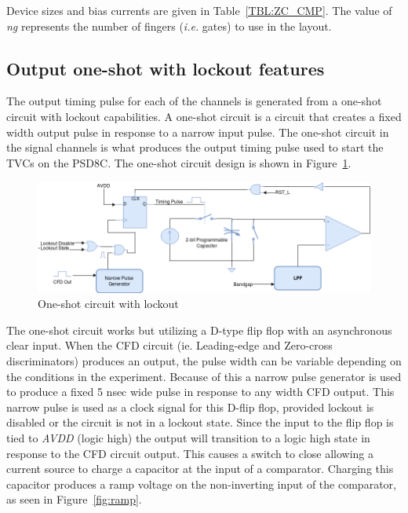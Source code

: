 \documentclass[12pt,oneside,final]{siuethesis}
\theoremstyle{definition}
\begin{document}
Device sizes and bias currents are given in Table~\ref{TBL:ZC_CMP}. The value of \emph{ng} represents the number of fingers (\emph{i.e.} gates) to use in the layout.\\ 
\subsection{Output one-shot with lockout features}
\par The output timing pulse for each of the channels is generated from a one-shot circuit with lockout capabilities. A one-shot circuit is a circuit that creates a fixed width output pulse in response to a narrow input pulse. The one-shot circuit in the signal channels is what produces the output timing pulse used to start the TVCs on the PSD8C. The one-shot circuit design is shown in Figure~\ref{fig:oneshot-circuit}.

\begin{figure}[htbp!]
\centering
\includegraphics[scale=.50,keepaspectratio=true]{./ch3_figures/oneshot_circuit.png} 
\caption{One-shot circuit with lockout}
\label{fig:oneshot-circuit}
\end{figure}

\par The one-shot circuit works but utilizing a D-type flip flop with an asynchronous clear input. When the CFD circuit (ie. Leading-edge and Zero-cross discriminators) produces an output, the pulse width can be variable depending on the conditions in the experiment. Because of this a narrow pulse generator is used to produce a fixed 5 nsec wide pulse in response to any width CFD output. This narrow pulse is used as a clock signal for this D-flip flop, provided lockout is disabled or the circuit is not in a lockout state. Since the input to the flip flop is tied to \emph{AVDD} (logic high) the output will transition to a logic high state in response to the CFD circuit output. This causes a switch to close allowing a current source to charge a capacitor at the input of a comparator. Charging this capacitor produces a ramp voltage on the non-inverting input of the comparator, as seen in Figure~\ref{fig:ramp}.
\end{document}
